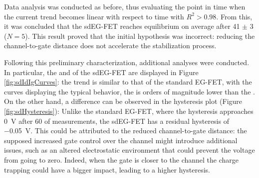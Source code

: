 Data analysis was conducted as before, thus evaluating the point in time when the current trend becomes linear with respect to time with $R^2>0.98$.
From this, it was concluded that the sdEG-FET reaches equilibrium on average after \SI{41}{} $\pm$ \SI{3}{\min} ($N = 5$). This result proved that the initial hypothesis was incorrect: reducing the channel-to-gate distance does not accelerate the stabilization process.

\begin{figure}
    \centering
    \hfill
    \caption{}
    \label{fig:sdParameters}
\end{figure}

Following this preliminary characterization, additional analyses were conducted. In particular, the \ids{} and \igs{} of the sdEG-FET are displayed in Figure \ref{fig:sdIdIgCurves}: the trend is similar to that of the standard EG-FET, with the curves displaying the typical behavior, \ie{} the \igs{} is orders of magnitude lower than the \ids{}. On the other hand, a difference can be observed in the hysteresis plot (Figure \ref{fig:sdHysteresis}): Unlike the standard EG-FET, where the hysteresis approaches \SI{0}{\V} after \SI{60}{\min} of measurements, the sdEG-FET has a residual hysteresis of \SI{-0.05}{\V}.  This could be attributed to the reduced channel-to-gate distance: the supposed increased gate control over the channel might introduce additional issues, such as an altered electrostatic environment that could prevent the voltage from going to zero. Indeed, when the gate is closer to the channel the charge trapping could have a bigger impact, leading to a higher hysteresis.

